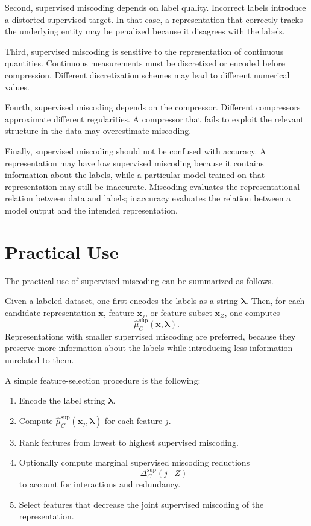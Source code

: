 Second, supervised miscoding depends on label quality. Incorrect labels introduce a distorted supervised target. In that case, a representation that correctly tracks the underlying entity may be penalized because it disagrees with the labels.

Third, supervised miscoding is sensitive to the representation of continuous quantities. Continuous measurements must be discretized or encoded before compression. Different discretization schemes may lead to different numerical values.

Fourth, supervised miscoding depends on the compressor. Different compressors approximate different regularities. A compressor that fails to exploit the relevant structure in the data may overestimate miscoding.

Finally, supervised miscoding should not be confused with accuracy. A representation may have low supervised miscoding because it contains information about the labels, while a particular model trained on that representation may still be inaccurate. Miscoding evaluates the representational relation between data and labels; inaccuracy evaluates the relation between a model output and the intended representation.

\section{Practical Use}
\label{sec:practical_use_supervised_miscoding}

The practical use of supervised miscoding can be summarized as follows.

Given a labeled dataset, one first encodes the labels as a string \(\boldsymbol{\lambda}\). Then, for each candidate representation \(\mathbf{x}\), feature \(\mathbf{x}_j\), or feature subset \(\mathbf{x}_Z\), one computes
\[
    \hat\mu_C^{\mathrm{sup}}(\mathbf{x},\boldsymbol{\lambda}).
\]
Representations with smaller supervised miscoding are preferred, because they preserve more information about the labels while introducing less information unrelated to them.

A simple feature-selection procedure is the following:

\begin{enumerate}
    \item Encode the label string \(\boldsymbol{\lambda}\).
    \item Compute \(\hat\mu_C^{\mathrm{sup}}(\mathbf{x}_j,\boldsymbol{\lambda})\) for each feature \(j\).
    \item Rank features from lowest to highest supervised miscoding.
    \item Optionally compute marginal supervised miscoding reductions
    \[
        \Delta_C^{\mathrm{sup}}(j\mid Z)
    \]
    to account for interactions and redundancy.
    \item Select features that decrease the joint supervised miscoding of the representation.
\end{enumerate}

